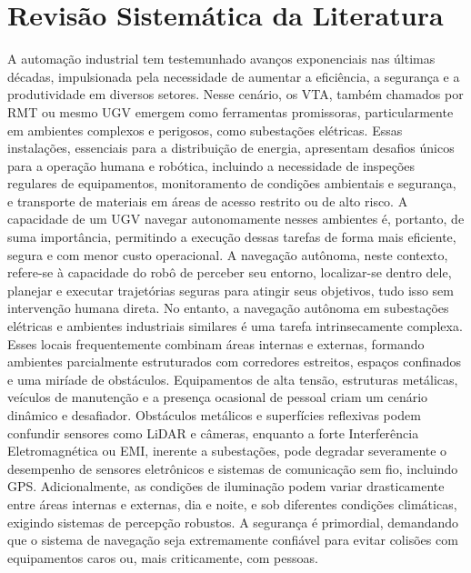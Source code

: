 \chapter[Revisão Sistemática da Literatura]{Revisão Sistemática da Literatura}

A automação industrial tem testemunhado avanços exponenciais nas últimas décadas, impulsionada pela necessidade de aumentar a eficiência, a segurança e a produtividade em diversos setores. Nesse cenário, os \ac{VTA}, também chamados por \ac{RMT} ou mesmo \ac{UGV} emergem como ferramentas promissoras, particularmente em ambientes complexos e perigosos, como subestações elétricas. Essas instalações, essenciais para a distribuição de energia, apresentam desafios únicos para a operação humana e robótica, incluindo a necessidade de inspeções regulares de equipamentos, monitoramento de condições ambientais e segurança, e transporte de materiais em áreas de acesso restrito ou de alto risco. A capacidade de um \ac{UGV} navegar autonomamente nesses ambientes é, portanto, de suma importância, permitindo a execução dessas tarefas de forma mais eficiente, segura e com menor custo operacional. A navegação autônoma, neste contexto, refere-se à capacidade do robô de perceber seu entorno, localizar-se dentro dele, planejar e executar trajetórias seguras para atingir seus objetivos, tudo isso sem intervenção humana direta.
No entanto, a navegação autônoma em subestações elétricas e ambientes industriais similares é uma tarefa intrinsecamente complexa. Esses locais frequentemente combinam áreas internas e externas, formando ambientes parcialmente estruturados com corredores estreitos, espaços confinados e uma miríade de obstáculos. Equipamentos de alta tensão, estruturas metálicas, veículos de manutenção e a presença ocasional de pessoal criam um cenário dinâmico e desafiador. Obstáculos metálicos e superfícies reflexivas podem confundir sensores como \ac{LiDAR} e câmeras, enquanto a forte Interferência Eletromagnética ou \ac{EMI}, inerente a subestações, pode degradar severamente o desempenho de sensores eletrônicos e sistemas de comunicação sem fio, incluindo \ac{GPS}. Adicionalmente, as condições de iluminação podem variar drasticamente entre áreas internas e externas, dia e noite, e sob diferentes condições climáticas, exigindo sistemas de percepção robustos. A segurança é primordial, demandando que o sistema de navegação seja extremamente confiável para evitar colisões com equipamentos caros ou, mais criticamente, com pessoas.
